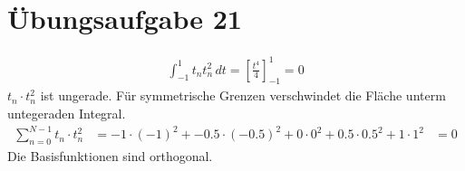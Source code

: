 

    \section*{Übungsaufgabe 21}
    \begin{align*}
        \int_{-1}^{1} t_n t_n^2 \, dt = \left[ \frac{t^4}{4} \right]_{-1}^{1} = 0
    \end{align*}
    $t_n \cdot t_n^2$ ist ungerade. Für symmetrische Grenzen verschwindet die Fläche unterm untegeraden Integral.
    \begin{align*}
        \sum_{n=0}^{N-1} t_n \cdot t_n^2 &= -1 \cdot (-1)^2 + -0.5 \cdot (-0.5)^2 + 0 \cdot 0^2 + 0.5 \cdot 0.5^2 + 1 \cdot 1^2
            & = 0
    \end{align*}
    Die Basisfunktionen sind orthogonal.


